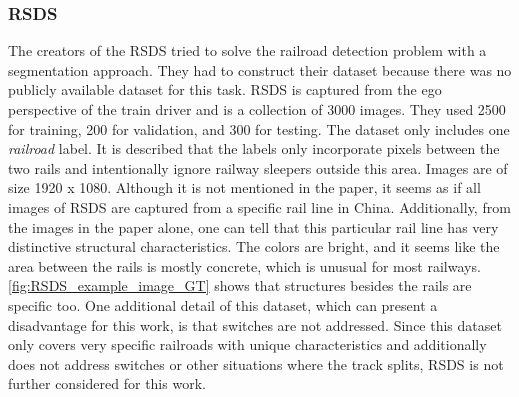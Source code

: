 \clearpage

\subsubsection{RSDS}
\label{subsubsec:RSDS}
The creators of the \ac{RSDS} \cite{railNet2019} tried to solve the railroad detection problem with a segmentation approach.
They had to construct their dataset because there was no publicly available dataset for this task. \ac{RSDS} is captured from the ego perspective of the train driver and is a collection of 3000 images. They used 2500 for training, 200 for validation, and 300 for testing. The dataset only includes one \textit{railroad} label. It is described that the labels only incorporate pixels between the two rails and intentionally ignore railway sleepers outside this area. Images are of size 1920 x 1080.
Although it is not mentioned in the paper, it seems as if all images of \ac{RSDS} are captured from a specific rail line in China. Additionally, from the images in the paper alone, one can tell that this particular rail line has very distinctive structural characteristics. The colors are bright, and it seems like the area between the rails is mostly concrete, which is unusual for most railways. \autoref{fig:RSDS_example_image_GT} shows that structures besides the rails are specific too.
One additional detail of this dataset, which can present a disadvantage for this work, is that switches are not addressed.
Since this dataset only covers very specific railroads with unique characteristics and additionally does not address switches or other situations where the track splits, \ac{RSDS} is not further considered for this work.

